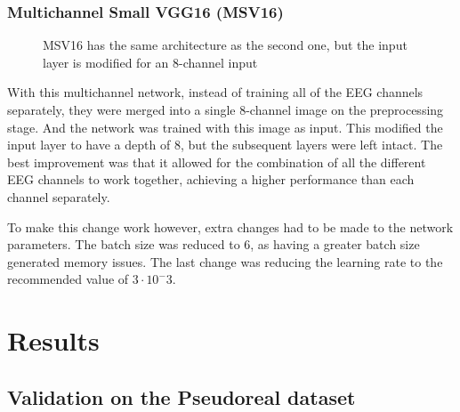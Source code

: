 \documentclass[conference]{IEEEtran}
\begin{document}
\subsubsection{Multichannel Small VGG16 (MSV16)}

\begin{figure}[h]

\caption[MSV16 Neural Network]{MSV16 has the same architecture as the second one, but the input layer is modified for an 8-channel input}
\label{fig:nnv3}
\end{figure}

With this multichannel network, instead of training all of the EEG channels separately, they were merged into a single 8-channel image on the preprocessing stage. And the network was trained with this image as input. This modified the input layer to have a depth of 8, but the subsequent layers were left intact. The best improvement was that it allowed for the combination of all the different EEG channels to work together, achieving a higher performance than each channel separately.

To make this change work however, extra changes had to be made to the network parameters. The batch size was reduced to 6, as having a greater batch size generated memory issues. The last change was reducing the learning rate to the recommended value of $3\cdot10^-3$.

\section{Results}
\label{sec:results}


\subsection{Validation on the Pseudoreal dataset}
\end{document}

